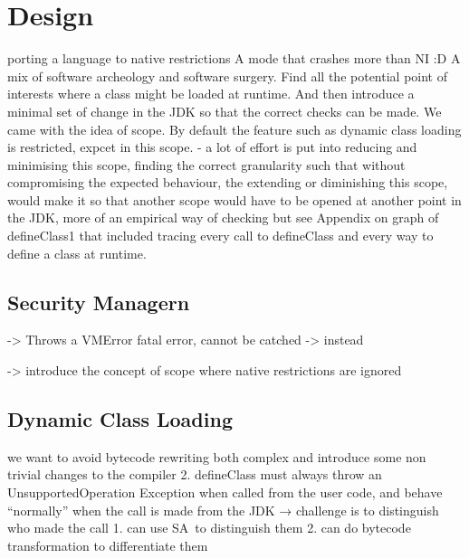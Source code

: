 

\chapter{Design}

porting a language to native restrictions
A mode that crashes more than NI :D
A mix of software archeology and software surgery.
Find all the potential point of interests where a class might be loaded at runtime.
And then introduce a minimal set of change in the JDK so that the correct checks can be made.
We came with the idea of scope. By default the feature such as dynamic class loading is restricted, expcet in this scope.
- a lot of effort is put into reducing and minimising this scope, finding the correct granularity such that without compromising
the expected behaviour, the extending or diminishing this scope, would make it so that another scope would have to be opened at another point in the JDK, more of an empirical way of checking but see Appendix on graph of defineClass1
that included tracing every call to defineClass and every way to define a class at runtime.
\section{Security Managern}
-> Throws a VMError fatal error, cannot be catched
-> instead

-> introduce the concept of scope where native restrictions are ignored

\section{Dynamic Class Loading}
we want to avoid bytecode rewriting both complex and introduce some non trivial changes to the compiler
2. defineClass must always throw an UnsupportedOperation Exception when called from the user code, and behave “normally” when the call is made from the JDK → challenge is to distinguish who made the call
    1. can use SA to distinguish them
    2. can do bytecode transformation to differentiate them

